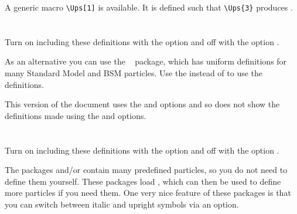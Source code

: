 \documentclass[UKenglish,texlive=2016]{\ATLASLATEXPATH atlasdoc}
\begin{document}
A generic macro \verb|\Ups[1]| is available.
It is defined such that \verb|\Ups{3}| produces .




\newpage
\section{}

Turn on including these definitions with the option  and off with the option .

As an alternative you can use the ~\cite{hepparticles} package,
which has uniform definitions for many Standard Model and BSM particles.
Use the  instead of  to use the  definitions.

This version of the document uses the  and  options and so
does not show the definitions made using the  and  options.
%


\newpage
\section{}

Turn on including these definitions with the option  and off with the option .

The packages  and/or  contain many predefined particles,
so you do not need to define them yourself.
These packages load , which can then be used to define more particles if you need them.
One very nice feature of these packages is that you can switch between italic and upright symbols via an option.









\printbibliography
\end{document}
